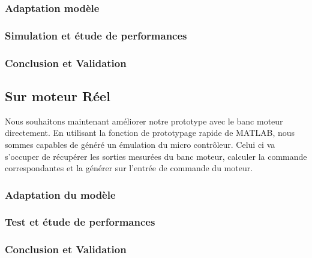 		\subsubsection{Adaptation modèle}
		\subsubsection{Simulation et étude de performances}
		\subsubsection{Conclusion et Validation}
	\subsection{Sur moteur Réel}
		Nous souhaitons maintenant améliorer notre prototype avec le banc moteur directement. En utilisant la fonction de prototypage rapide de MATLAB, nous sommes capables de généré un émulation du micro contrôleur. Celui ci va s'occuper de récupérer les sorties mesurées du banc moteur, calculer la commande correspondantes et la générer sur l'entrée de commande du moteur. 
		\subsubsection{Adaptation du modèle}
		\subsubsection{Test et étude de performances}
		\subsubsection{Conclusion et Validation}
		

